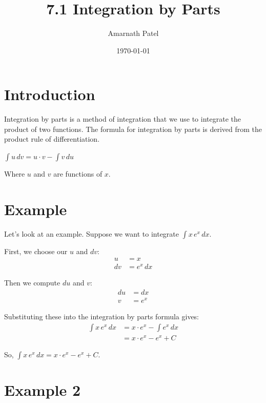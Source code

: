 \documentclass{article}
\begin{document}
\title{7.1 Integration by Parts}
\author{Amarnath Patel}
\date{\today}

\maketitle

\section{Introduction}

Integration by parts is a method of integration that we use to integrate the product of two functions. The formula for integration by parts is derived from the product rule of differentiation.

\begin{tcolorbox}[colback=red!5!white,colframe=red!75!black]
  \begin{center}
    $\int u \, dv = u \cdot v - \int v \, du$
  \end{center}
\end{tcolorbox}

Where $u$ and $v$ are functions of $x$.

\section{Example}

Let's look at an example. Suppose we want to integrate $\int x \, e^x \, dx$.

First, we choose our $u$ and $dv$:
\begin{align*}
    u &= x \\
    dv &= e^x \, dx
\end{align*}

Then we compute $du$ and $v$:
\begin{align*}
    du &= dx \\
    v &= e^x
\end{align*}

Substituting these into the integration by parts formula gives:
\begin{align*}
    \int x \, e^x \, dx &= x \cdot e^x - \int e^x \, dx \\
    &= x \cdot e^x - e^x + C
\end{align*}

So, $\int x \, e^x \, dx = x \cdot e^x - e^x + C$.

\section{Example 2}
\end{document}
